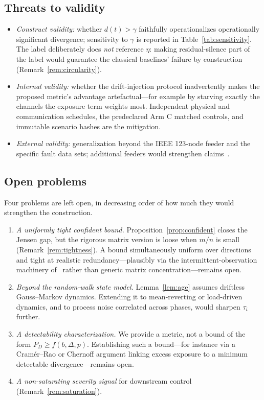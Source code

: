 \documentclass[journal]{IEEEtran}
\theoremstyle{plain}
\theoremstyle{definition}
\theoremstyle{remark}
\begin{document}
\subsection{Threats to validity}
\begin{itemize}
\item \emph{Construct validity:} whether $d(t)>\gamma$ faithfully
operationalizes operationally significant divergence; sensitivity to
$\gamma$ is reported in Table~\ref{tab:sensitivity}. The label
deliberately does \emph{not} reference $\eta$: making residual-silence
part of the label would guarantee the classical baselines' failure by
construction (Remark~\ref{rem:circularity}).
\item \emph{Internal validity:} whether the drift-injection protocol
inadvertently makes the proposed metric's advantage artefactual---for
example by starving exactly the channels the exposure term weights
most. Independent physical and communication schedules, the predeclared
Arm C matched controls, and immutable scenario hashes are the mitigation.
\item \emph{External validity:} generalization beyond the IEEE 123-node
feeder and the specific fault data sets; additional feeders would
strengthen claims~\cite{dugan2009}.
\end{itemize}

\subsection{Open problems}
Four problems are left open, in decreasing order of how much they would
strengthen the construction.
\begin{enumerate}
\item \emph{A uniformly tight confident bound.}
Proposition~\ref{prop:confident} closes the Jensen gap, but the rigorous
matrix version is loose when $m/n$ is small
(Remark~\ref{rem:tightness}). A bound simultaneously uniform over
directions and tight at realistic redundancy---plausibly via the
intermittent-observation machinery of~\cite{sinopoli2004,schenato2007}
rather than generic matrix concentration---remains open.
\item \emph{Beyond the random-walk state model.} Lemma~\ref{lem:age}
assumes driftless Gauss--Markov dynamics. Extending it to mean-reverting
or load-driven dynamics, and to process noise correlated across phases,
would sharpen $\tau_i$ further.
\item \emph{A detectability characterization.} We provide a metric, not a
bound of the form $P_D\ge f(b,\Delta,p)$. Establishing such a bound---for
instance via a Cram\'{e}r--Rao or Chernoff argument linking excess
exposure to a minimum detectable divergence---remains open.
\item \emph{A non-saturating severity signal} for downstream control
(Remark~\ref{rem:saturation}).
\end{enumerate}
\end{document}
